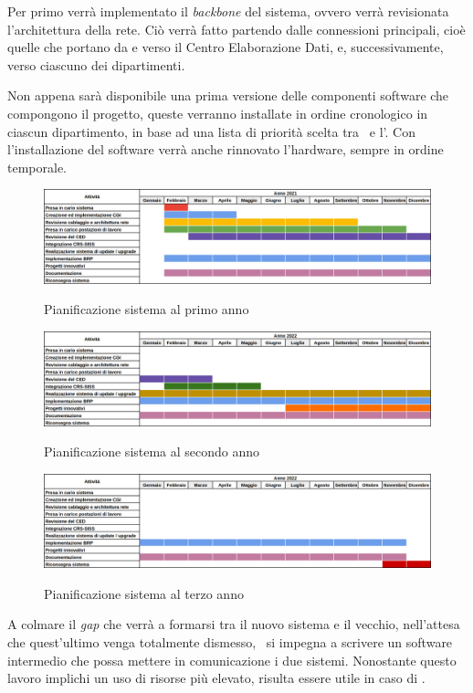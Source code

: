 		Per primo verrà implementato il \textit{backbone} del sistema, ovvero verrà revisionata l'architettura della rete.
		Ciò verrà fatto partendo dalle connessioni principali, cioè quelle che portano da e verso il Centro Elaborazione Dati, e, successivamente, verso ciascuno dei dipartimenti.
		
		Non appena sarà disponibile una prima versione delle componenti software che compongono il progetto, queste verranno installate in ordine cronologico in ciascun dipartimento, in base ad una lista di priorità scelta tra \azienda~e l'\istituto.
		Con l'installazione del software verrà anche rinnovato l'hardware, sempre in ordine temporale.
	
		\begin{figure}
			\centering
			\includegraphics[width=\linewidth-2cm]{img/pianificazione_anno_1.png}
			\caption{Pianificazione sistema al primo anno}
			\label{fig:anno_1}
			\includegraphics[width=\linewidth-2cm]{img/pianificazione_anno_2.png}
			\label{fig:anno_2}
			\caption{Pianificazione sistema al secondo anno}
			\includegraphics[width=\linewidth-2cm]{img/pianificazione_anno_3.png}
			\label{fig:anno_3}
			\caption{Pianificazione sistema al terzo anno}
		\end{figure}
	
		A colmare il \textit{gap} che verrà a formarsi tra il nuovo sistema e il vecchio, nell'attesa che quest'ultimo venga totalmente dismesso, \azienda~si impegna a scrivere un software intermedio che possa mettere in comunicazione i due sistemi.
		Nonostante questo lavoro implichi un uso di risorse più elevato, risulta essere utile in caso di \rollback.
	
